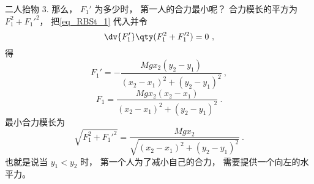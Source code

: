 \begin{example}{二人抬物}
3. 那么， $F_1'$ 为多少时， 第一人的合力最小呢？ 合力模长的平方为 $F_1^2 + F_1'^2$， 把\autoref{eq_RBSt_1} 代入并令
\begin{equation}
\dv{F_1'}\qty(F_1^2 + F_1'^2) = 0~,
\end{equation}
得
\begin{equation}
F_1' = -\frac{Mgx_2 (y_2 - y_1)}{(x_2-x_1)^2 + (y_2 -y_1)^2}~,
\end{equation}
\begin{equation}
F_1 = \frac{Mg x_2(x_2-x_1)}{(x_2-x_1)^2 + (y_2 -y_1)^2}~.
\end{equation}
最小合力模长为
\begin{equation}
\sqrt{F_1^2 + F_1'^2} = \frac{Mg x_2}{\sqrt{(x_2 - x_1)^2 + (y_2-y_1)^2}}~.
\end{equation}
也就是说当 $y_1 < y_2$ 时， 第一个人为了减小自己的合力， 需要提供一个向左的水平力。
\end{example}

